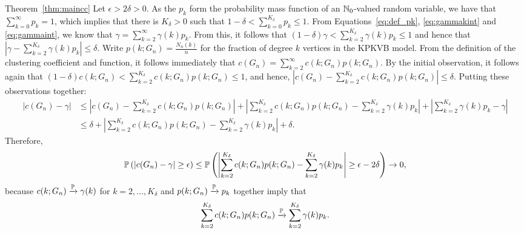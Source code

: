 \begin{proofof}{Theorem~\ref{thm:maincc}}
Let $\epsilon >2\delta >0$.
As the $p_k$ form the probability mass function of an $\mathbb{N}_0$-valued random variable, we have that $\sum_{k=0}^\infty p_k = 1$, which implies that there is $K_\delta >0$ such that $1-\delta < \sum_{k=0}^{K_\delta} p_k \leq 1$.
From Equations~\eqref{eq:def_pk}, \eqref{eq:gammakint} and \eqref{eq:gammaint}, we know that $\gamma = \sum_{k=2}^\infty \gamma(k)p_k$. 
From this, it follows that $(1-\delta)\gamma < \sum_{k=2}^{K_\delta} \gamma(k) p_k \leq 1$ and hence that $|\gamma - \sum_{k=2}^{K_\delta} \gamma(k)p_k| \leq \delta$. Write $p(k;G_n)=\frac{N_n(k)}{n}$ for the fraction of degree $k$ vertices in the KPKVB model. From the definition of the clustering coefficient and function, it follows immediately that $c(G_n) = \sum_{k=2}^\infty c(k;G_n)p(k;G_n)$. By the initial observation, it follows again that $(1-\delta)c(k;G_n) < \sum_{k=2}^{K_\delta} c(k;G_n)p(k;G_n) \leq 1$, and hence, $|c(G_n)-\sum_{k=2}^{K_\delta} c(k;G_n)p(k;G_n)| \leq \delta$.
Putting these observations together:
\begin{align*}
|c(G_n)-\gamma| &\leq \left|c(G_n)-\sum_{k=2}^{K_\delta}c(k;G_n)p(k;G_n)\right|+\left|\sum_{k=2}^{K_\delta} c(k;G_n)p(k;G_n) -\sum_{k=2}^{K_\delta} \gamma(k)p_k\right| +\left|\sum_{k=2}^{K_\delta} \gamma(k)p_k-\gamma\right| \\
 &\leq \delta +\left|\sum_{k=2}^{K_\delta} c(k;G_n)p(k;G_n) -\sum_{k=2}^{K_\delta} \gamma(k)p_k\right| +\delta. 
\end{align*}
Therefore, 
\[
	\mathbb{P}\left(|c(G_n)-\gamma|\geq \epsilon\right) \leq \mathbb{P}\left(\left|\sum_{k=2}^{K_\delta} c(k;G_n)p(k;G_n) -\sum_{k=2}^{K_\delta} \gamma(k)p_k\right| \geq \epsilon - 2\delta\right) \rightarrow 0,
\] 
because $c(k;G_n) \xrightarrow{\mathbb{P}} \gamma(k)$ for $k=2,\dots,K_\delta$ and $p(k;G_n) \xrightarrow{\mathbb{P}} p_k$ together imply that 
\[
	\sum_{k=2}^{K_\delta} c(k;G_n)p(k;G_n) \xrightarrow{\mathbb{P}} \sum_{k=2}^{K_\delta} \gamma(k) p_k.
\]
\end{proofof}



